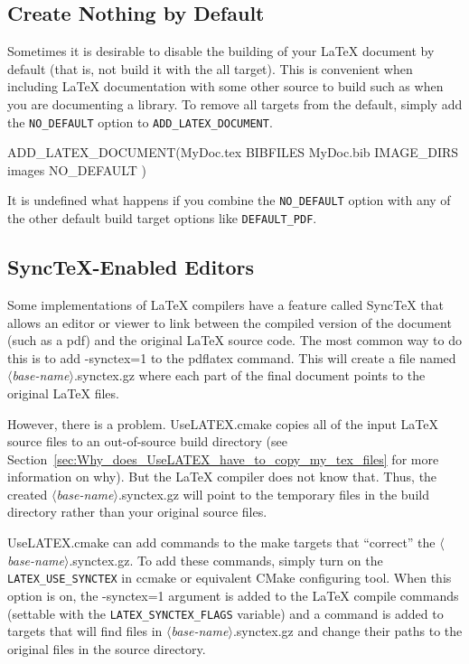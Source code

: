 \documentclass{article}
\newcommand*{\textfile}[1]{\textsf{#1}}
\newcommand*{\textprog}[1]{\textfile{#1}}
\newcommand*{\textcmake}[1]{\texttt{#1}}
\newcommand*{\textcmakevar}[1]{\textcmake{#1}}
\newcommand*{\textmaketarget}[1]{#1}
\newcommand*{\UseLATEX}{\textfile{UseLATEX.cmake}\xspace}
\newcommand*{\latex}{\LaTeX\xspace}
\renewcommand*{\synctex}{SyncTeX\xspace}
\newcommand*{\synctex}{SyncTeX\xspace}
\newcommand*{\ald}{\textcmake{ADD\_LATEX\_DOCUMENT}\xspace}
\begin{document}
  \subsection{Create Nothing by Default}
  \label{sec:CreateNothingByDefault}

  Sometimes it is desirable to disable the building of your \latex document
  by default (that is, not build it with the \textmaketarget{all} target).
  This is convenient when including \latex documentation with some other
  source to build such as when you are documenting a library.  To remove
  all targets from the default, simply add the \textcmake{NO\_DEFAULT}
  option to \ald.

  \begin{CodeListing}
ADD_LATEX_DOCUMENT(MyDoc.tex
  BIBFILES MyDoc.bib
  IMAGE_DIRS images
  NO_DEFAULT
  )
  \end{CodeListing}

  It is undefined what happens if you combine the \textcmake{NO\_DEFAULT}
  option with any of the other default build target options like
  \textcmake{DEFAULT\_PDF}.

  \subsection{\synctex-Enabled Editors}
  \label{sec:SynctexEnabledEditors}

  Some implementations of \latex compilers have a feature called \synctex
  that allows an editor or viewer to link between the compiled version of
  the document (such as a pdf) and the original \latex source code.  The
  most common way to do this is to add \textprog{-synctex=1} to the
  \textprog{pdflatex} command.  This will create a file named
  \textfile{\emph{$\langle$base-name$\rangle$}.synctex.gz} where each part
  of the final document points to the original \latex files.

  However, there is a problem.  \UseLATEX copies all of the input \latex
  source files to an out-of-source build directory (see
  Section~\ref{sec:Why_does_UseLATEX_have_to_copy_my_tex_files} for more
  information on why).  But the \latex compiler does not know that.  Thus,
  the created \textfile{\emph{$\langle$base-name$\rangle$}.synctex.gz} will
  point to the temporary files in the build directory rather than your
  original source files.

  \UseLATEX can add commands to the make targets that ``correct'' the
  \textfile{\emph{$\langle$base-name$\rangle$}.synctex.gz}.  To add these
  commands, simply turn on the \textcmakevar{LATEX\_USE\_SYNCTEX} in
  \textprog{ccmake} or equivalent CMake configuring tool.  When this option
  is on, the \textprog{-synctex=1} argument is added to the \latex compile
  commands (settable with the \textcmakevar{LATEX\_SYNCTEX\_FLAGS}
  variable) and a command is added to targets that will find files in
  \textfile{\emph{$\langle$base-name$\rangle$}.synctex.gz} and change their
  paths to the original files in the source directory.
\end{document}
